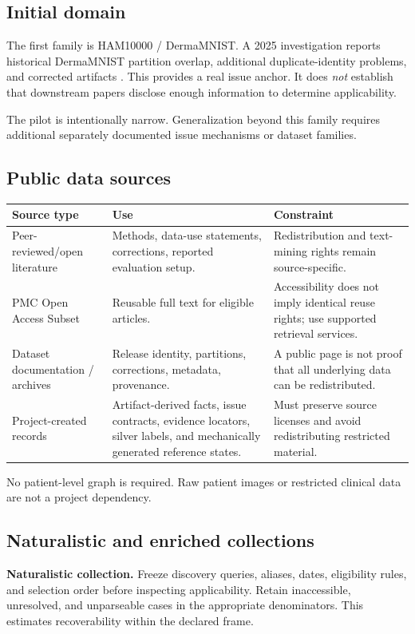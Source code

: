 \documentclass[11pt,a4paper]{article}
\begin{document}
\subsection{Initial domain}
The first family is HAM10000 / DermaMNIST. A 2025 investigation reports historical DermaMNIST partition overlap, additional duplicate-identity problems, and corrected artifacts \cite{abhishek2025,zenodo}. This provides a real issue anchor. It does \emph{not} establish that downstream papers disclose enough information to determine applicability.

The pilot is intentionally narrow. Generalization beyond this family requires additional separately documented issue mechanisms or dataset families.

\subsection{Public data sources}
\begin{tabularx}{\linewidth}{@{}L{38mm}Y Y@{}}
\toprule
\textbf{Source type} & \textbf{Use} & \textbf{Constraint}\\ \midrule
Peer-reviewed/open literature & Methods, data-use statements, corrections, reported evaluation setup. & Redistribution and text-mining rights remain source-specific.\\
PMC Open Access Subset \cite{pmcoa} & Reusable full text for eligible articles. & Accessibility does not imply identical reuse rights; use supported retrieval services.\\
Dataset documentation / archives & Release identity, partitions, corrections, metadata, provenance. & A public page is not proof that all underlying data can be redistributed.\\
Project-created records & Artifact-derived facts, issue contracts, evidence locators, silver labels, and mechanically generated reference states. & Must preserve source licenses and avoid redistributing restricted material.\\
\bottomrule
\end{tabularx}

No patient-level graph is required. Raw patient images or restricted clinical data are not a project dependency.

\subsection{Naturalistic and enriched collections}
\textbf{Naturalistic collection.} Freeze discovery queries, aliases, dates, eligibility rules, and selection order before inspecting applicability. Retain inaccessible, unresolved, and unparseable cases in the appropriate denominators. This estimates recoverability within the declared frame.
\end{document}
